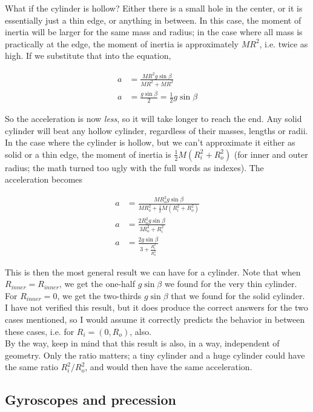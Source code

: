 What if the cylinder is hollow? Either there is a small hole in the center, or it is essentially just a thin edge, or anything in between. In this case, the moment of inertia will be larger for the same mass and radius; in the case where all mass is practically at the edge, the moment of inertia is approximately $M R^2$, i.e. twice as high. If we substitute that into the equation,

\begin{align}
a &= \frac{M R^2 g \sin \beta}{M R^2 + M R^2}\\
a &= \frac{g \sin \beta}{2} = \frac{1}{2} g \sin \beta
\end{align}

So the acceleration is now \emph{less}, so it will take longer to reach the end. Any solid cylinder will beat any hollow cylinder, regardless of their masses, lengths or radii.\\
In the case where the cylinder is hollow, but we can't approximate it either as solid or a thin edge, the moment of inertia is $\frac{1}{2} M(R_i^2 + R_o^2)$ (for inner and outer radius; the math turned too ugly with the full words as indexes). The acceleration becomes

\begin{align}
a &= \frac{M R_o^2 g \sin \beta}{M R_o^2 + \frac{1}{2} M (R_i^2 + R_o^2)}\\
a &= \frac{2 R_o^2 g \sin \beta}{3 R_o^2 + R_i^2}\\
a &= \frac{2 g \sin \beta}{3 + \frac{R_i^2}{R_o^2}}
\end{align}

This is then the most general result we can have for a cylinder. Note that when $R_{inner} = R_{inner}$, we get the one-half $g \sin\beta$ we found for the very thin cylinder. For $R_{inner} = 0$, we get the two-thirds $g \sin \beta$ that we found for the solid cylinder. I have not verified this result, but it does produce the correct answers for the two cases mentioned, so I would assume it correctly predicts the behavior in between these cases, i.e. for $R_i = (0, R_o)$, also.\\
By the way, keep in mind that this result is also, in a way, independent of geometry. Only the ratio matters; a tiny cylinder and a huge cylinder could have the same ratio $R_i^2/R_o^2$, and would then have the same acceleration.

\subsection{Gyroscopes and precession}

